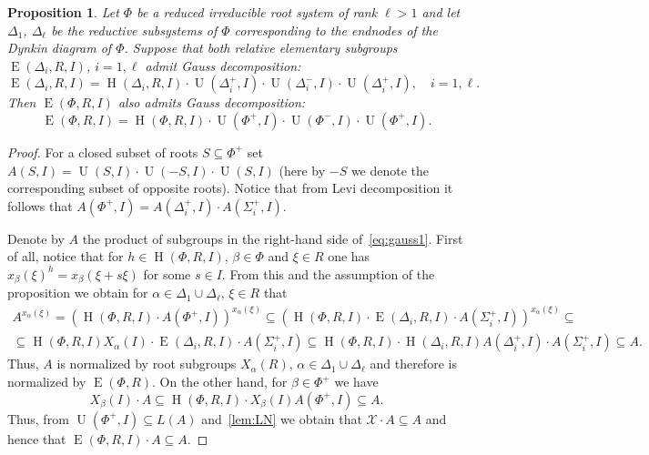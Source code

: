 \documentclass[11pt]{amsart}
\theoremstyle{plain}
\numberwithin{equation}{section}
\numberwithin{lemma}{section}
\newtheorem{prop}[lemma]{Proposition}
\theoremstyle{definition}
\theoremstyle{remark}
\DeclareMathOperator{\E}{E}
\DeclareMathOperator{\Hh}{H}
\DeclareMathOperator{\U}{U}
\begin{document}
\begin{prop} \label{thm:Gauss}
Let $\Phi$ be a reduced irreducible root system of rank $\ell > 1$ and let $\Delta_1$, $\Delta_\ell$ be
the reductive subsystems of $\Phi$ corresponding to the endnodes of the Dynkin diagram of $\Phi$.
Suppose that both relative elementary subgroups $\E(\Delta_i, R, I)$, $i=1, \ell$ admit Gauss decomposition:
\[ \E(\Delta_i, R, I) = \Hh(\Delta_i, R, I) \cdot \U(\Delta^+_i, I) \cdot \U(\Delta^-_i, I) \cdot \U(\Delta^+_i, I), \quad i=1, \ell. \]
Then $\E(\Phi, R, I)$ also admits Gauss decomposition:
\begin{equation} \label{eq:gauss1} \E(\Phi, R, I) = \Hh(\Phi, R, I) \cdot \U(\Phi^+, I) \cdot \U(\Phi^-, I) \cdot \U(\Phi^+, I). \end{equation}
\end{prop}
\begin{proof}
For a closed subset of roots $S \subseteq \Phi^+$ set $A(S, I) = \U(S, I) \cdot \U(-S, I) \cdot \U(S, I)$ (here by $-S$ we denote the corresponding subset of opposite roots).
Notice that from Levi decomposition it follows that $A(\Phi^+, I) = A(\Delta_i^+, I) \cdot A(\Sigma_i^+, I)$.

Denote by $A$ the product of subgroups in the right-hand side of~\eqref{eq:gauss1}.
First of all, notice that for $h \in \Hh(\Phi, R, I)$, $\beta \in \Phi$ and $\xi \in R$ one has $x_\beta(\xi)^h = x_\beta(\xi + s\xi)$ for some $s\in I$.
From this and the assumption of the proposition we obtain for $\alpha \in \Delta_1 \cup \Delta_\ell$, $\xi \in R$ that
\begin{multline} \nonumber
 A^{x_\alpha(\xi)} = (\Hh(\Phi, R, I) \cdot A(\Phi^+, I))^{x_\alpha(\xi)} \subseteq (\Hh(\Phi, R, I) \cdot \E(\Delta_i, R, I) \cdot A(\Sigma_i^+, I))^{x_\alpha(\xi)} \subseteq \\
  \subseteq \Hh(\Phi, R, I) X_{\alpha}(I) \cdot \E(\Delta_i, R, I) \cdot A(\Sigma_i^+, I) \subseteq \Hh(\Phi, R, I) \cdot \Hh(\Delta_i, R, I) A(\Delta_i^+, I) \cdot A(\Sigma_i^+, I) \subseteq A.
\end{multline}
Thus, $A$ is normalized by root subgroups $X_\alpha(R)$, $\alpha \in \Delta_1 \cup \Delta_\ell$ and therefore is normalized by $\E(\Phi, R)$.
On the other hand, for $\beta \in \Phi^+$ we have
\begin{equation} \nonumber
 X_{\beta}(I) \cdot A \subseteq \Hh(\Phi, R, I) \cdot X_{\beta}(I) A(\Phi^+, I) \subseteq A.
\end{equation}
Thus, from $\U(\Phi^+, I) \subseteq L(A)$ and~\cref{lem:LN} we obtain that $\mathcal{X} \cdot A \subseteq A$ and hence
 that $\E(\Phi, R, I) \cdot A \subseteq A$.
\end{proof}
\end{document}

